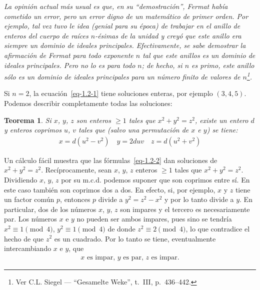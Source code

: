 \documentclass[bibtotoc,leqno,spanish]{amsbook}
\numberwithin{equation}{section}
\newenvironment{comm}%
	{\begin{list}{}{\setlength{\leftmargin}{2\parindent}\setlength{\topsep}{\baselineskip}}\item\itshape}
	{\end{list}}
\theoremstyle{note}
\theoremstyle{note}
\newtheorem{theorem}{Teorema}
\theoremstyle{rem}
\numberwithin{theorem}{section}
\numberwithin{proposition}{section}
\numberwithin{definition}{section}
\numberwithin{lemma}{section}
\numberwithin{corollary}{section}
\numberwithin{example}{section}
\numberwithin{footnote}{section}%
\begin{document}
\begin{comm}
La opini\'on actual m\'as usual es que, en su ``demostraci\'on'', Fermat hab\'ia cometido
un error, pero un error digno de un matem\'atico de primer orden. Por ejemplo, tal vez
tuvo le idea (genial para su \'epoca) de trabajar en el anillo de enteros del cuerpo de
ra\'ices $n$-\'esimas de la unidad y crey\'o que este anillo era siempre un dominio de ideales
principales. Efectivamente, se sabe demostrar la afirmaci\'on de Fermat para todo exponente $n$
tal que este anillos es un dominio de ideales principales. Pero no lo es para todo $n$;
de hecho,
si $n$ es primo, este anillo s\'olo es un dominio de ideales principales para un n\'umero
finito de valores de $n$\footnote{Ver C.L. Siegel --- ``Gesamelte Weke'', t.~III, p.~436--442.}.
\end{comm}

Si $n=2$, la ecuaci\'on~\eqref{eq-1.2-1} tiene soluciones enteras, por
ejemplo $(3,4,5)$. Podemos describir completamente todas las soluciones:

\begin{theorem}\label{teo1.2.1}
Si $x$, $y$, $z$ son enteros $\geq 1$ tales que $x^{2}+y^{2}=z^{2}$, existe un entero
$d$ y enteros coprimos $u$, $v$ tales que (salvo una permutaci\'on de $x$ e $y$) se tiene:
\begin{gather}\label{eq-1.2-2}
x = d(u^{2}-v^{2})\quad y = 2duv\quad z = d(u^{2}+v^{2})
\end{gather}
\end{theorem}

Un c\'alculo f\'acil muestra que las f\'ormulas~\eqref{eq-1.2-2} dan soluciones
de $x^{2}+y^{2}=z^{2}$.
Rec\'iprocamente, sean $x$, $y$, $z$ enteros $\geq 1$ tales que $x^{2}+y^{2}=z^{2}$. Dividiendo
$x$, $y$, $z$ por su m.c.d. podemos suponer que son coprimos entre s\'i. En este caso tambi\'en
son coprimos dos a dos. En efecto, si, por ejemplo, $x$ y $z$ tiene un factor com\'un $p$, entonces
$p$ divide a $y^{2} = z^{2}-x^{2}$ y por lo tanto divide a $y$. En particular, dos de
los n\'umeros
$x$, $y$, $z$ son impares y el tercero es necesariamente par. Los n\'umeros $x$ e $y$ no
pueden ser ambos impares, pues sino se tendr\'ia $x^{2}\equiv 1\pmod 4$, $y^{2}\equiv 1\pmod 4$
de donde $z^{2}\equiv 2\pmod 4$, lo que contradice el hecho de que $z^{2}$ es un cuadrado.
Por lo tanto se tiene, eventualmente intercambiando $x$ e $y$, que
\begin{gather}\label{eq-1.2-3}
\text{$x$ es impar, $y$ es par, $z$ es impar.}
\end{gather}
\end{document}
